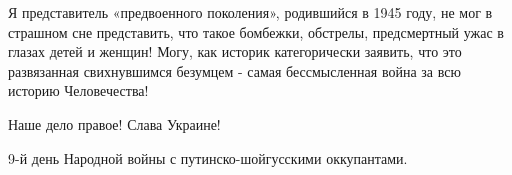 
Я представитель «предвоенного поколения», родившийся в 1945 году, не мог в
страшном сне представить, что такое бомбежки, обстрелы, предсмертный ужас в
глазах детей и женщин! Могу, как историк категорически заявить, что это
развязанная свихнувшимся безумцем - самая бессмысленная война за всю историю
Человечества!

Наше дело правое! Слава Украине!

9-й день Народной войны с путинско-шойгусскими оккупантами.

